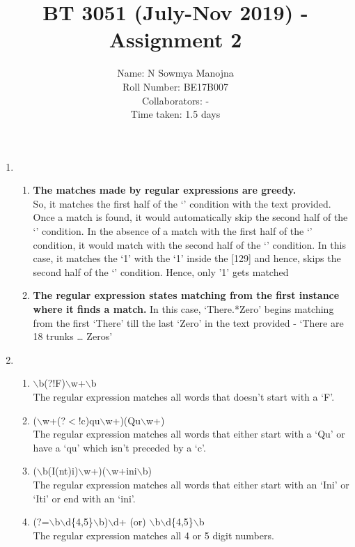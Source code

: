 \documentclass[11pt,a4paper]{article}
\title{BT 3051 (July-Nov 2019) - Assignment 2}
\author{Name: N Sowmya Manojna\\Roll Number: BE17B007\\ Collaborators: - \\Time taken: 1.5 days}
\date{}
\begin{document}
\maketitle
\begin{enumerate}
\item{
\begin{enumerate}
\item {\textbf{The matches made by regular expressions are greedy.}\\
So, it matches the first half of the `\textbar' condition with the text provided. Once a match is found, it would automatically skip the second half of the `\textbar' condition. In the absence of a match with the first half of the `\textbar' condition, it would match with the second half of the `\textbar' condition. 
In this case, it matches the `1' with the `1' inside the [129] and hence, skips the second half of the `\textbar' condition. Hence, only '1' gets matched}
\item{\textbf{The regular expression states matching from the first instance where it finds a match.} In this case, `There.*Zero' begins matching from the first `There' till the last `Zero' in the text provided  - `There are 18 trunks … Zeros'}\end{enumerate}}

\vspace{0.5em}

\item{
\begin{enumerate}
\item {$\backslash$b(?!F)$\backslash$w+$\backslash$b} \\
The regular expression matches all words that doesn't start with a `F'.
\item {($\backslash$w+(?$<$!c)qu$\backslash$w+)\textbar(Qu$\backslash$w+)} \\
The regular expression matches all words that either start with a `Qu' or have a `qu' which isn't preceded by a `c'.
\item {($\backslash$b(I(n\textbar t)i)$\backslash$w+)\textbar($\backslash$w+ini$\backslash$b)} \\
The regular expression matches all words that either start with an `Ini' or `Iti' or end with an `ini'.
\item {(?=$\backslash$b$\backslash$d\{4,5\}$\backslash$b)$\backslash$d+ (or) $\backslash$b$\backslash$d\{4,5\}$\backslash$b}\\
The regular expression matches all 4 or 5 digit numbers.
\end{enumerate}}


\end{enumerate}
\end{document}
